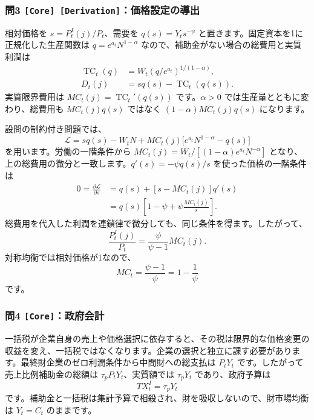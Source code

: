 \documentclass[
  japanese,
  lualatex,
  ja=standard,
  11pt,
  a4paper]{ltjsarticle}
\begin{document}
\subsubsection{\texorpdfstring{問3
\texttt{{[}Core{]}\ {[}Derivation{]}}：価格設定の導出}{問3 {[}Core{]} {[}Derivation{]}：価格設定の導出}}\label{ux554f3-core-derivationux4fa1ux683cux8a2dux5b9aux306eux5c0eux51fa}

相対価格を \(s=P_t^I(j)/P_t\)、需要を \(q(s)=Y_ts^{-\psi}\)
と置きます。固定資本を1に正規化した生産関数は \(q=e^{a_t}N^{1-\alpha}\)
なので、補助金がない場合の総費用と実質利潤は \[
\begin{aligned}
\operatorname{TC}_t(q)
&=W_t(q/e^{a_t})^{1/(1-\alpha)},\\
D_t(j)&=s q(s)-\operatorname{TC}_t(q(s)).
\end{aligned}
\] 実質限界費用は \(MC_t(j)=\operatorname{TC}_t'(q(s))\)
です。\(\alpha>0\) では生産量とともに変わり、総費用も \(MC_t(j)q(s)\)
ではなく \((1-\alpha)MC_t(j)q(s)\) になります。

設問の制約付き問題では、 \[
\mathcal L
=sq(s)-W_tN
+MC_t(j)\bigl[e^{a_t}N^{1-\alpha}-q(s)\bigr]
\] を用います。労働の一階条件から
\(MC_t(j)=W_t/[(1-\alpha)e^{a_t}N^{-\alpha}]\)
となり、上の総費用の微分と一致します。\(q'(s)=-\psi q(s)/s\)
を使った価格の一階条件は \[
\begin{aligned}
0=\frac{\partial\mathcal L}{\partial s}
&=q(s)+[s-MC_t(j)]q'(s)\\
&=q(s)\left[1-\psi+\psi\frac{MC_t(j)}s\right].
\end{aligned}
\]
総費用を代入した利潤を連鎖律で微分しても、同じ条件を得ます。したがって、
\[
\frac{P_t^I(j)}{P_t}
=\frac{\psi}{\psi-1}MC_t(j).
\] 対称均衡では相対価格が1なので、 \[
MC_t=\frac{\psi-1}{\psi}=1-\frac1\psi
\] です。

\subsubsection{\texorpdfstring{問4
\texttt{{[}Core{]}}：政府会計}{問4 {[}Core{]}：政府会計}}\label{ux554f4-coreux653fux5e9cux4f1aux8a08}

一括税が企業自身の売上や価格選択に依存すると、その税は限界的な価格変更の収益を変え、一括税ではなくなります。企業の選択と独立に課す必要があります。最終財企業のゼロ利潤条件から中間財への総支払は
\(P_tY_t\) です。したがって売上比例補助金の総額は
\(\tau_pP_tY_t\)、実質額では \(\tau_pY_t\) であり、政府予算は \[
TX_t^I=\tau_pY_t
\]
です。補助金と一括税は集計予算で相殺され、財を吸収しないので、財市場均衡は
\(Y_t=C_t\) のままです。
\end{document}
